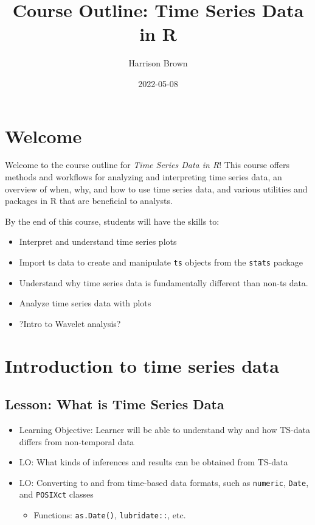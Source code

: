 \documentclass[
]{book}
\title{Course Outline: Time Series Data in R}
\author{Harrison Brown}
\date{2022-05-08}
\providecommand{\tightlist}{%
  \setlength{\itemsep}{0pt}\setlength{\parskip}{0pt}}
\begin{document}
\maketitle

{
\setcounter{tocdepth}{1}
\tableofcontents
}
\hypertarget{welcome}{%
\chapter*{Welcome}\label{welcome}}

Welcome to the course outline for \emph{Time Series Data in R}! This course offers methods and workflows for analyzing and interpreting time series data, an overview of when, why, and how to use time series data, and various utilities and packages in R that are beneficial to analysts.

By the end of this course, students will have the skills to:

\begin{itemize}
\tightlist
\item
  Interpret and understand time series plots
\item
  Import ts data to create and manipulate \texttt{ts} objects from the \texttt{stats} package
\item
  Understand why time series data is fundamentally different than non-ts data.
\item
  Analyze time series data with plots
\item
  ?Intro to Wavelet analysis?
\end{itemize}

\hypertarget{introduction-to-time-series-data}{%
\chapter{Introduction to time series data}\label{introduction-to-time-series-data}}

\hypertarget{lesson-what-is-time-series-data}{%
\section{Lesson: What is Time Series Data}\label{lesson-what-is-time-series-data}}

\begin{itemize}
\tightlist
\item
  Learning Objective: Learner will be able to understand why and how TS-data differs from non-temporal data
\item
  LO: What kinds of inferences and results can be obtained from TS-data
\item
  LO: Converting to and from time-based data formats, such as \texttt{numeric}, \texttt{Date}, and \texttt{POSIXct} classes

  \begin{itemize}
  \tightlist
  \item
    Functions: \texttt{as.Date()}, \texttt{lubridate::}, etc.
  \end{itemize}
\end{itemize}
\end{document}
